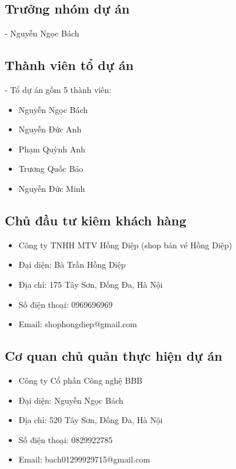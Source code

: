 \documentclass[12pt]{article}
\begin{document}
\subsection{Trưởng nhóm dự án}
\hspace{1cm}- Nguyễn Ngọc Bách

\subsection{Thành viên tổ dự án}
\hspace{1cm}- Tổ dự án gồm 5 thành viên:
\begin{itemize}[label=+, leftmargin=2cm]
\item Nguyễn Ngọc Bách
\item Nguyễn Đức Anh
\item Phạm Quỳnh Anh
\item Trương Quốc Bảo
\item Nguyễn Đức Minh
\end{itemize}

\subsection{Chủ đầu tư kiêm khách hàng}
\begin{itemize}[label=, leftmargin=1cm]
\item Công ty TNHH MTV Hồng Diệp (shop bán vé Hồng Diệp)
\item Đại diện: Bà Trần Hồng Diệp
\item Địa chỉ: 175 Tây Sơn, Đống Đa, Hà Nội
\item Số điện thoại: 0969696969
\item Email: shophongdiep@gmail.com
\end{itemize}

\subsection{Cơ quan chủ quản thực hiện dự án}
\begin{itemize}[label=, leftmargin=1cm]
\item Công ty Cổ phần Công nghệ BBB
\item Đại diện: Nguyễn Ngọc Bách
\item Địa chỉ: 520 Tây Sơn, Đống Đa, Hà Nội
\item Số điện thoại: 0829922785
\item Email: bach01299929715@gmail.com
\end{itemize}
\end{document}
